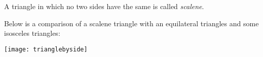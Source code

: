 \documentclass[12pt]{article}
\begin{document}
A triangle in which no two sides have the same  is called \emph{scalene}.

Below is a comparison of a scalene triangle with an equilateral triangles and some isosceles triangles:

\begin{center}
\texttt{[image: trianglebyside]}
\end{center}
\end{document}
